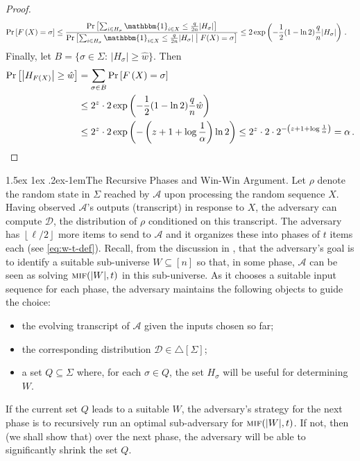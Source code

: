 \documentclass[10pt,a4paper]{article}
\makeatletter
\theoremstyle{definition}
\theoremstyle{remark}
\newcommand\squeezepar{\@startsection{paragraph}{4}%
{\z@}{1.5ex \@plus1ex \@minus.2ex}{-1em}{\normalfont\normalsize\bfseries}}
\newcommand{\mypara}[1]{\squeezepar{{#1}.}}
\newcommand{\indic}{\mathbbm{1}}
\newcommand{\cA}{\mathcal{A}}
\newcommand{\cD}{\mathcal{D}}
\newcommand{\floor}[1]{{\left\lfloor{#1}\right\rfloor}}
\newcommand{\mif}{\textsc{mif}\xspace}
\newcommand{\rl}{\mathbf{\ell}}             %
\makeatother
\begin{document}
\begin{itemize}
\begin{itemize}
\begin{proof}
\begin{align*}
    \Pr\left[F\left(X\right)=\sigma\right]
    &\le \frac{\Pr\left[\sum_{i\in H_{\sigma}}\indic_{i \in X} \le \frac{q}{2n}|H_{\sigma}|\right]}%
      {\Pr\left[\sum_{i\in H_{\sigma}}\indic_{i \in X} \le \frac{q}{2n}|H_{\sigma}| \bigm| F(X)=\sigma\right]}
    \le 2\exp\left(-\frac{1}{2}(1-\ln 2)\frac{q}{n}|H_{\sigma}|\right) \,.
  \end{align*}
  Finally, let $B = \{\sigma\in\Sigma:\, |H_{\sigma}|\ge\hat{w}\}$. Then
  \begin{align*}
    \Pr\left[\left|H_{F(X)}\right|\ge\hat{w}\right]
    &=\sum_{\sigma\in B}\Pr\left[F\left(X\right)=\sigma\right] \\
    &\le 2^{z}\cdot2\exp\left(-\frac{1}{2}(1-\ln 2)\frac{q}{n}\hat{w}\right) \\
    &\le 2^{z}\cdot2\exp\left(-\left(z+1+\log\frac{1}{\alpha}\right)\ln2\right) 
    \le 2^{z}\cdot2\cdot2^{-\left(z+1+\log\frac{1}{\alpha}\right)}
    = \alpha \,. \qedhere
	\end{align*}
\end{proof}

\mypara{The Recursive Phases and Win-Win Argument} Let $\rho$ denote the
random state in $\Sigma$ reached by $\cA$ upon processing the random sequence
$X$. Having observed $\cA$'s outputs (transcript) in response to $X$, the
adversary can compute $\cD$, the distribution of $\rho$ conditioned on this
transcript. The adversary has $\floor{\rl/2}$ more items to send to $\cA$ and
it organizes these into phases of $t$ items each (see \cref{eq:w-t-def}).
Recall, from the discussion in , that the
adversary's goal is to identify a suitable sub-universe $W \subseteq [n]$ so
that, in some phase, $\cA$ can be seen as solving $\mif(|W|,t)$ in this
sub-universe.  As it chooses a suitable input sequence for each phase, the
adversary maintains the following objects to guide the choice:
\begin{itemize}
  \item the evolving transcript of $\cA$ given the inputs chosen so far;
  \item the corresponding distribution $\cD \in \triangle[\Sigma]$;
  \item a set $Q \subseteq \Sigma$ where, for each $\sigma \in Q$, the set
  $H_\sigma$ will be useful for determining $W$.
\end{itemize}
If the current set $Q$ leads to a suitable $W$, the adversary's strategy for
the next phase is to recursively run an optimal sub-adversary for
$\mif(|W|,t)$. If not, then (we shall show that) over the next phase, the
adversary will be able to significantly shrink the set $Q$.


\end{itemize}
\end{itemize}
\end{document}
